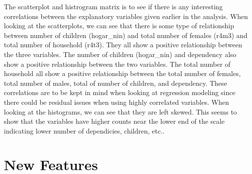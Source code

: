 \documentclass[11pt]{article}
\begin{document}
    The scatterplot and histrogram matrix is to see if there is any
interesting correlations between the explanatory variables given earlier
in the analysis. When looking at the scatterplots, we can see that there
is some type of relationship between number of children (hogar\_nin) and
total number of females (r4m3) and total number of household (r4t3).
They all show a positive relationship between the three variables. The
number of children (hogar\_nin) and dependency also show a positive
relationship between the two variables. The total number of household
all show a positive relationship between the total number of females,
total number of males, total of number of children, and dependency.
These correlations are to be kept in mind when looking at regression
modeling since there could be residual issues when using highly
correlated variables. When looking at the histograms, we can see that
they are left skewed. This seems to show that the variables have higher
counts near the lower end of the scale indicating lower number of
dependicies, children, etc..

    \section{New Features}\label{new-features}
\end{document}
